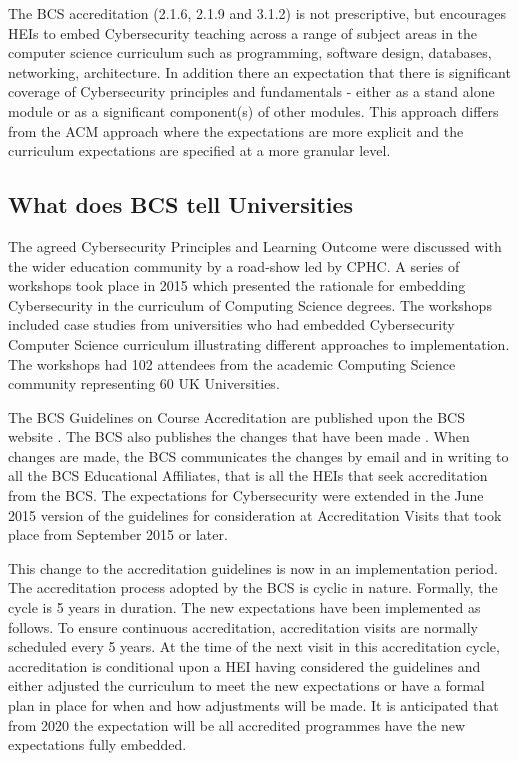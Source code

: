 \documentclass[sigconf,anonymous]{acmart}
\begin{document}
The BCS accreditation (2.1.6, 2.1.9 and 3.1.2) is not prescriptive, but encourages HEIs to embed Cybersecurity teaching across a range of subject areas in the computer science curriculum such as programming, software design, databases, networking, architecture. In addition there an expectation that there is significant coverage of Cybersecurity principles and fundamentals - either as a stand alone module or as a significant component(s) of other modules. This approach differs from the ACM approach where the expectations are more explicit and the curriculum expectations are specified at a more granular level.


\subsection{What does BCS tell Universities}
The agreed Cybersecurity Principles and Learning Outcome \cite{CPHCISC2} were discussed with the wider education community by a road-show led by CPHC. A series of workshops took place in 2015 which presented the rationale for embedding Cybersecurity in the curriculum of Computing Science degrees. The workshops included case studies from universities who had embedded Cybersecurity Computer Science curriculum illustrating different approaches to implementation. The workshops had 102 attendees from the academic Computing Science community representing 60 UK Universities. 

The BCS Guidelines on Course Accreditation are published upon the BCS website \cite{BCS2018a}. The BCS also publishes the changes that have been made \cite{BCS2018b}. When changes are made, the BCS communicates the changes by email and in writing to all the BCS Educational Affiliates, that is all the HEIs that seek accreditation from the BCS. The expectations for Cybersecurity were extended in the June 2015 version of the guidelines for consideration at Accreditation Visits that took place from September 2015 or later.

This change to the accreditation guidelines is now in an implementation period. The accreditation process adopted by the BCS is cyclic in nature. Formally, the cycle is 5 years in duration. The new expectations have been implemented as follows. To ensure continuous accreditation, accreditation visits are normally scheduled every 5 years. At the time of the next visit in this accreditation cycle, accreditation is conditional upon a HEI having considered the guidelines and either adjusted the curriculum to meet the new expectations or have a formal plan in place for when and how adjustments will be made.  It is anticipated that from 2020 the expectation will be all accredited programmes have the new expectations fully embedded.
\end{document}
